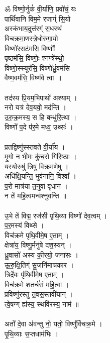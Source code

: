 \section{}
ॐ विष्णो॒र्नुकं॑ वी॒र्या॑णि॒ प्रवो॑चं॒ यः \\
पार्थि॑वानि विम॒मे रजाग्ं॑ सि॒यो \\
अस्क॑भाय॒दुत्त॑रग्ं स॒धस्थं॑ \\
विचक्रमा॒णस्त्रे॒धोरु॑गा॒यो\\
 विष्णो॑र॒राट॑मसि॒ विष्णोः᳚ \\
पृ॒ष्ठम॑सि॒ विष्णोः॒ श्नप्त्रे᳚स्थो॒ \\
विष्णो॒स्स्यूर॑सि॒ विष्णो᳚र्ध्रु॒वम॑सि\\
वैष्ण॒वम॑सि॒ विष्ण॑वे त्वा ॥\\
\\
तद॑स्य प्रि॒यम॒भिपाथो॑ अश्याम् । \\
नरो यत्र॑ देव॒यवो॒ मद॑न्ति । \\
उ॒रु॒क्र॒मस्य॒ स हि बन्धु॑रि॒त्था । \\
विष्णो᳚ प॒दे प॑र॒मे मध्व॒ उथ्सः॑ । \\
\\
प्रतद्विष्णु॑स्स्तवते वी॒र्या॑य । \\
मृ॒गो न भी॒मः कु॑च॒रो गि॑रि॒ष्ठाः । \\
यस्यो॒रुषु॑ त्रि॒षु वि॒क्रम॑णेषु । \\
अधि॑क्षि॒यन्ति॒ भुव॑नानि॒ विश्वा᳚  । \\
प॒रो मात्र॑या त॒नुवा॑ वृधान । \\
न ते॑ महि॒त्वमन्व॑श्नुवन्ति ॥\\
\\
उ॒भे ते॑ विद्म॒ रज॑सी पृथि॒व्या विष्णो॑ देव॒त्वम् । \\
प॒र॒मस्य॑ विथ्से । \\
विच॑क्रमे पृथि॒वीमे॒ष ए॒ताम् । \\
क्षेत्रा॑य॒ विष्णु॒र्मनु॑षे दश॒स्यन् । \\
ध्रु॒वासो॑ अस्य की॒रयो॒ जना॑सः । \\
ऊ॒रु॒क्षि॒तिग्ं सु॒जनि॑माचकार । \\
त्रिर्दे॒वः पृ॑थि॒वीमे॒ष ए॒ताम् । \\
विच॑क्रमे श॒तर्च॑सं महि॒त्वा । \\
प्रविष्णु॑रस्तु त॒वस॒स्तवी॑यान् । \\
त्वे॒षग्ग् ह्य॑स्य॒ स्थवि॑रस्य॒ नाम॑ ॥\\
\\
अतो᳚ दे॒वा अ॑वन्तु नो॒ यतो॒ विष्णु᳚र्विचक्र॒मे । \\
पृ॒थि॒व्याः स॒प्तधाम॑भिः । \\
